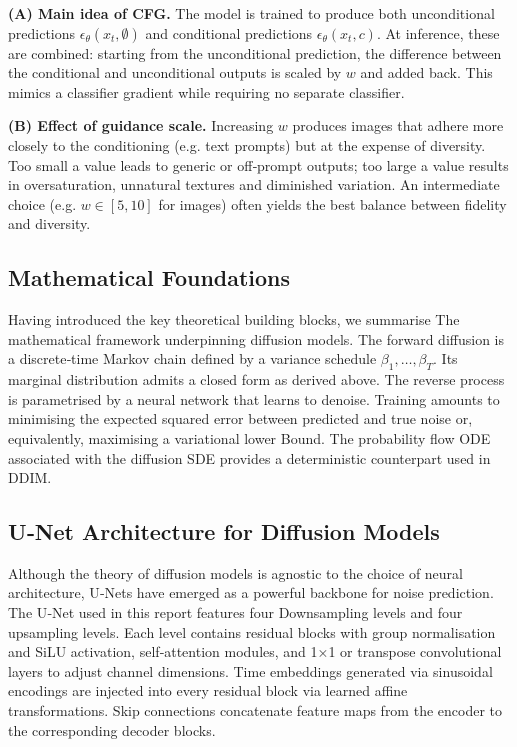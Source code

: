 \begin{solutionbox}
  \textbf{(A) Main idea of CFG.}  The model is trained to produce
  both unconditional predictions $\epsilon_\theta(x_t,\emptyset)$ and
  conditional predictions $\epsilon_\theta(x_t,c)$.  At inference,
  these are combined: starting from the unconditional prediction, the
  difference between the conditional and unconditional outputs is
  scaled by $w$ and added back.  This mimics a classifier gradient
  while requiring no separate classifier.

  \textbf{(B) Effect of guidance scale.}  Increasing $w$ produces
  images that adhere more closely to the conditioning (e.g. text
  prompts) but at the expense of diversity.  Too small a value leads
  to generic or off‑prompt outputs; too large a value results in
  oversaturation, unnatural textures and diminished variation.  An
  intermediate choice (e.g. $w\in[5,10]$ for images) often yields
  the best balance between fidelity and diversity.
\end{solutionbox}

\subsection{Mathematical Foundations}

Having introduced the key theoretical building blocks, we summarise
The mathematical framework underpinning diffusion models.  The
forward diffusion is a discrete‑time Markov chain defined by a
variance schedule $\beta_1,\dots,\beta_T$.  Its marginal distribution
admits a closed form as derived above.  The reverse process is
parametrised by a neural network that learns to denoise.  Training
amounts to minimising the expected squared error between predicted
and true noise or, equivalently, maximising a variational lower
Bound.  The probability flow ODE associated with the diffusion SDE
provides a deterministic counterpart used in DDIM.

\subsection{U‑Net Architecture for Diffusion Models}

Although the theory of diffusion models is agnostic to the choice of
neural architecture, U‑Nets have emerged as a powerful backbone for
noise prediction.  The U‑Net used in this report features four
Downsampling levels and four upsampling levels.  Each level contains
residual blocks with group normalisation and SiLU activation,
self‑attention modules, and 1×1 or transpose convolutional layers to
adjust channel dimensions.  Time embeddings generated via
sinusoidal encodings are injected into every residual block via
learned affine transformations.  Skip connections concatenate
feature maps from the encoder to the corresponding decoder blocks.

